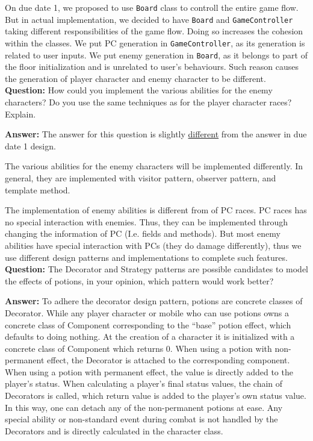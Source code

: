\documentclass[11pt]{article}
\theoremstyle{plain} \newtheorem{theorem*}{Theorem}[subsection]
\begin{document}
On due date 1, we proposed to use \texttt{Board} class to controll the entire 
game flow. But in actual implementation, we decided to have \texttt{Board} 
and \texttt{GameController} taking different responsibilities of the game flow. 
Doing so increases the cohesion within the classes. We put PC generation in 
\texttt{GameController}, as its generation is related to user inputs. We put 
enemy generation in \texttt{Board}, as it belongs to part of the floor 
initialization and is unrelated to user’s behaviours. Such reason causes the 
generation of player character and enemy character to be different. \\

\textbf{Question:}
How could you implement the various abilities for the enemy characters? Do you
use the same techniques as for the player character races? Explain. 

\textbf{Answer:}
The answer for this question is slightly \underline{different} from the answer 
in due date 1 design. 

The various abilities for the enemy characters will be implemented differently.
In general, they are implemented with visitor pattern, observer pattern, and 
template method.

The implementation of enemy abilities is different from of PC races. PC races
has no special interaction with enemies. Thus, they can be implemented through
changing the information of PC (I.e. fields and methods). But most enemy
abilities have special interaction with PCs (they do damage differently), thus
we use different design patterns and implementations to complete such features. \\


\textbf{Question:}
The Decorator and Strategy patterns are possible candidates to model the
effects of potions, in your opinion, which pattern would work better? 

\textbf{Answer:}
To adhere the decorator design pattern, potions are concrete classes of
Decorator. While any player character or mobile who can use potions owns a
concrete class of Component corresponding to the “base” potion effect, which
defaults to doing nothing. At the creation of a character it is initialized
with a concrete class of Component which returns 0. When using a potion with
non-permanent effect, the Decorator is attached to the corresponding component.
When using a potion with permanent effect, the value is directly added to the
player’s status. When calculating a player’s final status values, the chain of
Decorators is called, which return value is added to the player’s own status
value. In this way, one can detach any of the non-permanent potions at ease.
Any special ability or non-standard event during combat is not handled by the
Decorators and is directly calculated in the character class. 
\end{document}
